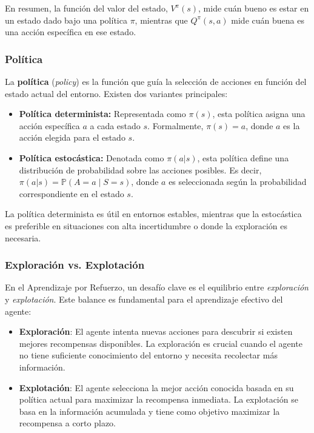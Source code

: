 \documentclass[a4paper,12pt, twoside]{report}
\begin{document}
En resumen, la función del valor del estado, \(V^{\pi}(s)\), mide cuán bueno es estar en un estado dado 
bajo una política \(\pi\), mientras que \(Q^{\pi}(s, a)\) mide cuán buena es una acción específica en 
ese estado.

\subsubsection{Política}

La \textbf{política} (\textit{policy}) es la función que guía la selección de acciones en función del estado actual del entorno. Existen dos variantes principales:

\begin{itemize}
    \item \textbf{Política determinista:} Representada como $\pi(s)$, esta política asigna una acción específica $a$ a cada estado $s$. Formalmente, $\pi(s) = a$, donde $a$ es la acción elegida para el estado $s$.

    \item \textbf{Política estocástica:} Denotada como $\pi(a|s)$, esta política define una distribución de probabilidad sobre las acciones posibles. Es decir, $\pi(a|s) = \mathbb{P}(A = a \mid S = s)$, donde $a$ es seleccionada según la probabilidad correspondiente en el estado $s$.
\end{itemize}

La política determinista es útil en entornos estables, mientras que la estocástica es preferible en situaciones con alta incertidumbre o donde la exploración es necesaria.


\subsubsection{Exploración vs. Explotación}

En el Aprendizaje por Refuerzo, un desafío clave es el equilibrio entre \textit{exploración} y 
\textit{explotación}. Este balance es fundamental para el aprendizaje efectivo del agente:

\begin{itemize}
    \item \textbf{Exploración}: El agente intenta nuevas acciones para descubrir si existen mejores 
    recompensas disponibles. La exploración es crucial cuando el agente no tiene suficiente conocimiento 
    del entorno y necesita recolectar más información.
    \item \textbf{Explotación}: El agente selecciona la mejor acción conocida basada en su 
    política actual para maximizar la recompensa inmediata. La explotación se basa en la información 
    acumulada y tiene como objetivo maximizar la recompensa a corto plazo.
\end{itemize}
\end{document}
